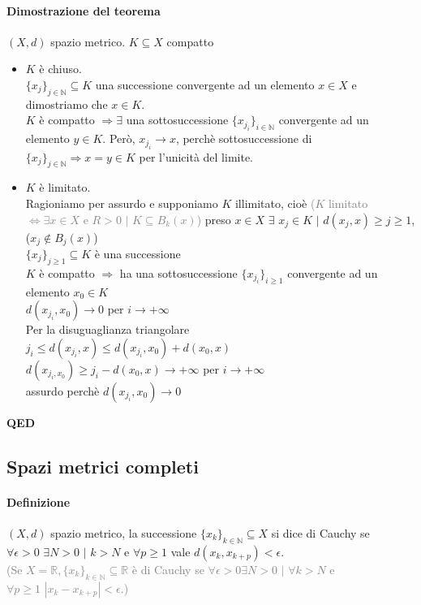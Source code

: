 \documentclass{article}
\newcommand{\R}{\mathbb{R}}
\newcommand{\N}{\mathbb{N}}
\begin{document}
\paragraph{{Dimostrazione del teorema}}
$(X,d)$ spazio metrico. $K \subseteq X$ compatto
\begin{itemize}
    \item $K$ è chiuso.\\
    $\{x_j\}_{j\in\N}\subseteq K$ una successione convergente ad un elemento $x \in X$ e dimostriamo che $x \in K$.\\
    $K$ è compatto $\Rightarrow \exists$ una sottosuccessione $\{x_{j_i}\}_{i\in\N}$ convergente ad un elemento $y \in K$. Però, $x_{j_i} \rightarrow x$, perchè sottosuccessione di $\{x_j\}_{j  \in \N} \Rightarrow x = y \in K$ per l'unicità del limite.
    \item $K $ è limitato.\\
    Ragioniamo per assurdo e supponiamo $K$ illimitato, cioè \textcolor{grey}{($K$ limitato $\Leftrightarrow \exists x \in X$ e $R>0 \,\, |\,\, K \subseteq B_k(x)$)} preso $x \in X \,\,\exists\,\, x_j \in K\,\, |\,\, d(x_j,x)\geq j\geq 1$, ($x_j\notin B_j(x)$)\\
    $\{x_j\}_{j\geq 1}\subseteq K$ è una successione\\ $K$ è compatto $ \Rightarrow$ ha una sottosuccessione $\{x_{j_i}\}_{i\geq 1}$ convergente ad un elemento $x_0 \in K$\\
    $d(x_{j_i},x_0)\rightarrow 0$ per $i \rightarrow+\infty$\\
    Per la disuguaglianza triangolare\\ $j_i \leq d(x_{j_i},x)\leq d(x_{j_i},x_0)+d(x_0,x)$\\
    $d(x_{j_i,x_0})\geq j_i - d(x_0,x)\rightarrow +\infty$ per $i \rightarrow +\infty$\\
    assurdo perchè $d(x_{j_i},x_0)\rightarrow 0$
\end{itemize}
\begin{flushright}
\textbf{QED}
\end{flushright}

\subsection{Spazi metrici completi}
\paragraph{Definizione}
$(X,d)$ spazio metrico, la successione $\{x_k\}_{k \in\N}\subseteq X$ si dice di Cauchy se $\forall \epsilon >0 \,\, \exists N >0 \,\,|\,\, k >N$ e $\forall p\geq 1$ vale $d(x_k,x_{k+p})<\epsilon$.\\
\textcolor{grey}{(Se $X=\R, \{x_k\}_{k \in\N}\subseteq\R$ è di Cauchy se $\forall \epsilon >0 \exists N >0 \,\, |\,\, \forall k>N$ e $\forall p \geq 1\,\, |x_k - x_{k+p}|<\epsilon$.)}
\end{document}
